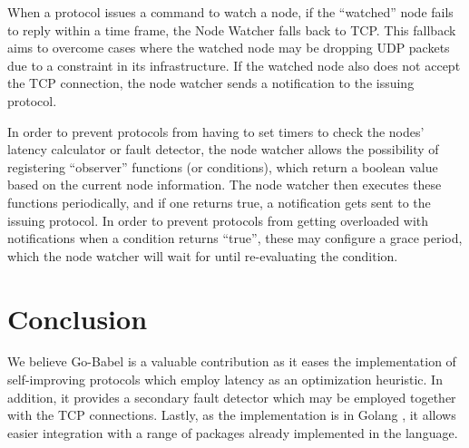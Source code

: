 When a protocol issues a command to watch a node, if the ``watched'' node fails to reply within a time frame, the Node Watcher falls back to TCP. This fallback aims to overcome cases where the watched node may be dropping UDP packets due to a constraint in its infrastructure. If the watched node also does not accept the TCP connection, the node watcher sends a notification to the issuing protocol.


In order to prevent protocols from having to set timers to check the nodes' latency calculator or fault detector, the node watcher allows the possibility of registering ``observer'' functions (or conditions), which return a boolean value based on the current node information. The node watcher then executes these functions periodically, and if one returns true, a notification gets sent to the issuing protocol. In order to prevent protocols from getting overloaded with notifications when a condition returns ``true'', these may configure a grace period, which the node watcher will wait for until re-evaluating the condition.

\section{Conclusion}

We believe Go-Babel is a valuable contribution as it eases the implementation of self-improving protocols which employ latency as an optimization heuristic. In addition, it provides a secondary fault detector which may be employed together with the TCP connections. Lastly, as the implementation is in Golang , it allows easier integration with a range of packages already implemented in the language. 
